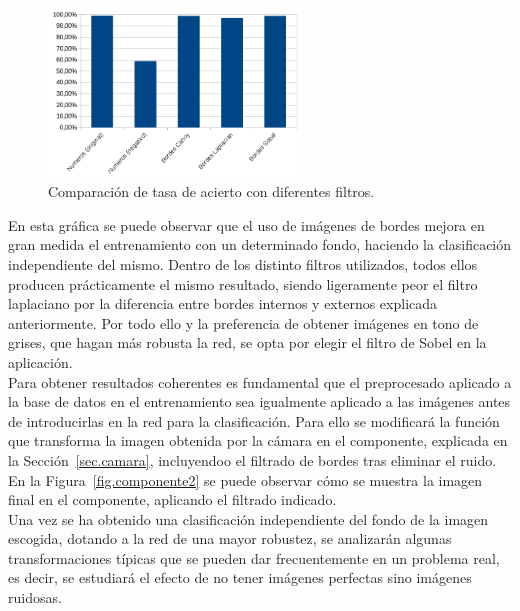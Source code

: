 \begin{figure}[H]
	\begin{center}
		\includegraphics[width=0.6\textwidth]{figures/filtros}
		\caption{Comparación de tasa de acierto con diferentes filtros.}
		\label{fig.filtros}
	\end{center}
\end{figure}

En esta gráfica se puede observar que el uso de imágenes de bordes mejora en gran medida el entrenamiento con un determinado fondo, haciendo la clasificación independiente del mismo. Dentro de los distinto filtros utilizados, todos ellos producen prácticamente el mismo resultado, siendo ligeramente peor el filtro laplaciano por la diferencia entre bordes internos y externos explicada anteriormente. Por todo ello y la preferencia de obtener imágenes en tono de grises, que hagan más robusta la red, se opta por elegir el filtro de Sobel en la aplicación.\\

Para obtener resultados coherentes es fundamental que el preprocesado aplicado a la base de datos en el entrenamiento sea igualmente aplicado a las imágenes antes de introducirlas en la red para la clasificación. Para ello se modificará la función que transforma la imagen obtenida por la cámara en el componente, explicada en la Sección~\ref{sec.camara}, incluyendoo el filtrado de bordes tras eliminar el ruido. En la Figura~\ref{fig.componente2} se puede observar cómo se muestra la imagen final en el componente, aplicando el filtrado indicado.\\

Una vez se ha obtenido una clasificación independiente del fondo de la imagen escogida, dotando a la red de una mayor robustez, se analizarán algunas transformaciones típicas que se pueden dar frecuentemente en un problema real, es decir, se estudiará el efecto de no tener imágenes perfectas sino imágenes ruidosas.


